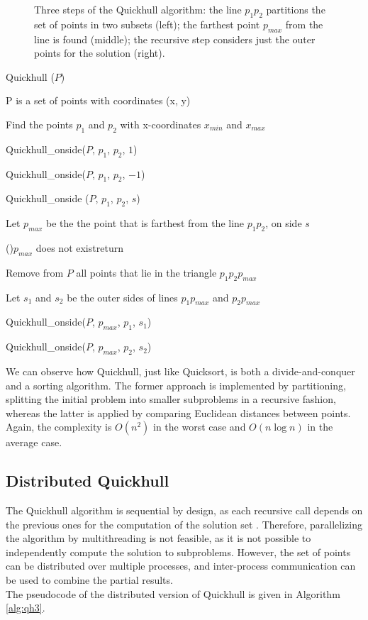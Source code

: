 \documentclass[]{finalproject}
\begin{document}
\begin{figure}[H]
\begin{minipage}{.33\linewidth}
	\end{minipage}
    \caption{Three steps of the Quickhull algorithm: the line $p_1p_2$ partitions the set of points in two subsets (left); the farthest point $p_{max}$ from the line is found (middle); the recursive step considers just the outer points for the solution (right).}
    \label{fig:qh-steps}
\end{figure}

\begin{algorithm}
    \caption{Quickhull ($P$)}
    \label{alg:qh1}
    P is a set of points with coordinates (x, y)

    Find the points $p_1$ and $p_2$ with x-coordinates $x_{min}$ and $x_{max}$

    Quickhull\_onside($P$, $p_1$, $p_2$, $1$)

    Quickhull\_onside($P$, $p_1$, $p_2$, $-1$)
\end{algorithm}
\begin{algorithm}
  \caption{Quickhull\_onside ($P$, $p_1$, $p_2$, $s$)}
  \label{alg:qh2}
  Let $p_{max}$ be the the point that is farthest from the line $p_1p_2$, on side $s$

  \If(){$p_{max}$ does not exist}{return}

  Remove from $P$ all points that lie in the triangle $p_1p_2p_{max}$

  Let $s_1$ and $s_2$ be the outer sides of lines $p_1p_{max}$ and $p_2p_{max}$

  Quickhull\_onside($P$, $p_{max}$, $p_1$, $s_1$)

  Quickhull\_onside($P$, $p_{max}$, $p_2$, $s_2$)
\end{algorithm}

We can observe how Quickhull, just like Quicksort,
is both a divide-and-conquer and a sorting algorithm. The former approach is implemented by partitioning,
splitting the initial problem into smaller subproblems in a recursive fashion, whereas the latter is applied by comparing
Euclidean distances between points. Again, the complexity is $O(n^2)$ in the worst case and $O(n\log{n})$ in the average case.

\subsection{Distributed Quickhull}
The Quickhull algorithm is sequential by design,
as each recursive call depends on the previous ones for the computation of the solution set \cite{rameshconvex}.
Therefore, parallelizing the algorithm by multithreading is not feasible, as it is not possible to independently compute the solution to subproblems.
However, the set of points can be distributed over multiple processes, and inter-process communication can be used to combine the partial results.\\
The pseudocode of the distributed version of Quickhull is given in Algorithm \ref{alg:qh3}.
\end{document}
